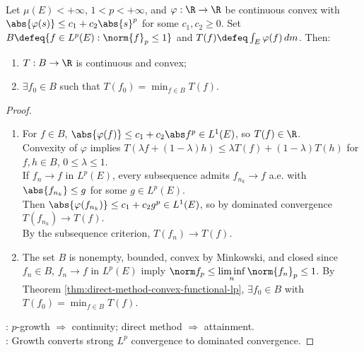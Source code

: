 \begin{corollary} \label{cor:integral-convex-functional-unit-ball-minimizer} \\
Let $\mu(E)<+\infty$, $1<p<+\infty$, and $\varphi:\R\to\R$ be continuous convex with $\abs{\varphi(s)}\leq c_1+c_2\abs{s}^p$ for some $c_1,c_2\geq0$. Set $B\defeq\{f\in L^p(E):\norm{f}_p\leq1\}$ and $T(f)\defeq\int_E\varphi(f)\,dm$. Then:
\begin{enumerate}[label=(\roman*)]
\setlength{\itemsep}{0pt}
\item $T:B\to\R$ is continuous and convex;
\item $\exists f_0\in B$ such that $T(f_0)=\min_{f\in B}T(f)$.
\end{enumerate}
\begin{proof}
\begin{enumerate}[label=(\roman*)]
\setlength{\itemsep}{0pt}
\item For $f\in B$, $\abs{\varphi(f)}\leq c_1+c_2\abs f^p\in L^1(E)$, so $T(f)\in\R$.\\
Convexity of $\varphi$ implies $T(\lambda f+(1-\lambda)h)\leq\lambda T(f)+(1-\lambda)T(h)$ for $f,h\in B$, $0\leq\lambda\leq1$.\\
If $f_n\to f$ in $L^p(E)$, every subsequence admits $f_{n_k}\to f$ a.e. with $\abs{f_{n_k}}\leq g$ for some $g\in L^p(E)$.\\
Then $\abs{\varphi(f_{n_k})}\leq c_1+c_2g^p\in L^1(E)$, so by dominated convergence $T(f_{n_k})\to T(f)$.\\
By the subsequence criterion, $T(f_n)\to T(f)$.
\item The set $B$ is nonempty, bounded, convex by Minkowski, and closed since $f_n\in B$, $f_n\to f$ in $L^p(E)$ imply $\norm f_p\leq\liminf\limits_n\norm{f_n}_p\leq1$. By Theorem \ref{thm:direct-method-convex-functional-lp}, $\exists f_0\in B$ with $T(f_0)=\min_{f\in B}T(f)$.
\end{enumerate}
: $p$-growth $\Rightarrow$ continuity; direct method $\Rightarrow$ attainment.\\
: Growth converts strong $L^p$ convergence to dominated convergence.
\end{proof}
\end{corollary}
